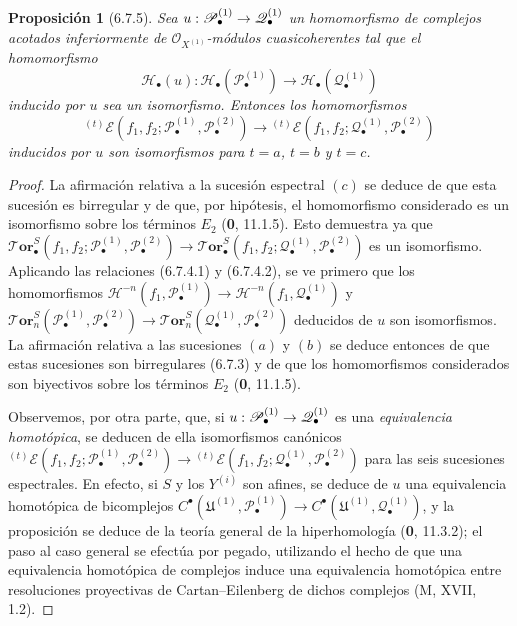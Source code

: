 \documentclass[10pt,oneside,openany]{book}
\theoremstyle{egaenv}\newtheorem*{env}{---}
\theoremstyle{egastatement}
\newtheorem*{proposition}{Proposición}
\theoremstyle{egadescription}
\renewcommand{\to}{\mathchoice{\longrightarrow}{\rightarrow}{\rightarrow}{\rightarrow}}
\begin{document}
\begin{proposition}[6.7.5]
\label{III.6.7.5}
Sea $u:\mathscr P_\bullet^{(1)}\to\mathscr Q_\bullet^{(1)}$ un
homomorfismo de complejos acotados inferiormente de
$\mathscr O_{X^{(1)}}$-módulos cuasicoherentes tal que el homomorfismo
\[
  \mathscr H_\bullet(u):
  \mathscr H_\bullet(\mathscr P_\bullet^{(1)})
  \longrightarrow
  \mathscr H_\bullet(\mathscr Q_\bullet^{(1)})
\]
inducido por $u$ sea un isomorfismo. Entonces los homomorfismos
\[
  {}^{(t)}\mathscr E
  (f_1,f_2;\mathscr P_\bullet^{(1)},\mathscr P_\bullet^{(2)})
  \longrightarrow
  {}^{(t)}\mathscr E
  (f_1,f_2;\mathscr Q_\bullet^{(1)},\mathscr P_\bullet^{(2)})
\]
inducidos por $u$ son isomorfismos para $t=a$, $t=b$ y $t=c$.
\end{proposition}

\begin{proof}
La afirmación relativa a la sucesión espectral $(c)$ se deduce de que esta
sucesión es birregular y de que, por hipótesis, el homomorfismo considerado es
un isomorfismo sobre los términos $E_2$ (\textbf{0}, 11.1.5). Esto
demuestra ya que
$
  \boldsymbol{\mathscr{T}\!or}_\bullet^S
  (f_1,f_2;\mathscr P_\bullet^{(1)},\mathscr P_\bullet^{(2)})
  \longrightarrow
  \boldsymbol{\mathscr{T}\!or}_\bullet^S
  (f_1,f_2;\mathscr Q_\bullet^{(1)},\mathscr P_\bullet^{(2)})
$
es un isomorfismo. Aplicando las relaciones (6.7.4.1) y (6.7.4.2), se ve
primero que los homomorfismos
$
  \mathcal H^{-n}(f_1,\mathscr P_\bullet^{(1)})
  \longrightarrow
  \mathcal H^{-n}(f_1,\mathscr Q_\bullet^{(1)})
  $ y $
  \boldsymbol{\mathscr{T}\!or}_n^S
  (\mathscr P_\bullet^{(1)},\mathscr P_\bullet^{(2)})
  \longrightarrow
  \boldsymbol{\mathscr{T}\!or}_n^S
  (\mathscr Q_\bullet^{(1)},\mathscr P_\bullet^{(2)})
$
deducidos de $u$ son isomorfismos. La afirmación relativa a las sucesiones
$(a)$ y $(b)$ se deduce entonces de que estas sucesiones son birregulares
(6.7.3) y de que los homomorfismos considerados son biyectivos sobre los
términos $E_2$ (\textbf{0}, 11.1.5).

Observemos, por otra parte, que, si
$u:\mathscr P_\bullet^{(1)}\to\mathscr Q_\bullet^{(1)}$ es una
\emph{equivalencia homotópica}, se deducen de ella isomorfismos canónicos
$
  {}^{(t)}\mathscr E
  (f_1,f_2;\mathscr P_\bullet^{(1)},\mathscr P_\bullet^{(2)})
  \longrightarrow
  {}^{(t)}\mathscr E
  (f_1,f_2;\mathscr Q_\bullet^{(1)},\mathscr P_\bullet^{(2)})
$
para las seis sucesiones espectrales. En efecto, si $S$ y los $Y^{(i)}$ son
afines, se deduce de $u$ una equivalencia homotópica de bicomplejos
$
  C^\bullet(\mathfrak U^{(1)},\mathscr P_\bullet^{(1)})
  \longrightarrow
  C^\bullet(\mathfrak U^{(1)},\mathscr Q_\bullet^{(1)})$,
y la proposición se deduce de la teoría general de la hiperhomología
(\textbf{0}, 11.3.2); el paso al caso general se efectúa por pegado,
utilizando el hecho de que una equivalencia homotópica de complejos induce
una equivalencia homotópica entre resoluciones proyectivas de
Cartan--Eilenberg de dichos complejos (M, XVII, 1.2).
\end{proof}
\end{document}
